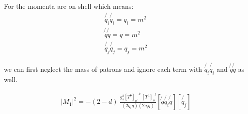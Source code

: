 For the momenta are on-shell which means:
\begin{equation}
\begin{split}
\not{q_i}\not{q_i} = {q_i}= m^2\\
\not{q}\not{q} = {q}= m^2\\
\not{q_j}\not{q_j} = {q_j}= m^2
\end{split}
\end{equation}

we can first neglect the mass of patrons and ignore each term with $ \not{q_i}\not{q_i} $ and  $ \not{q}\not{q} $ as well.

\begin{equation}
\begin{split}
|M_1|^2=-(2-d)\:\frac{g_s^2  {[T^b]_{o\:^{\prime}}}^k \: {[T^a]_o}^l }{(2q_i q)(2q_i q)}
[\not{q} \not{q_i} \not{q}]
[\not{q_j}]
\end{split}
\end{equation}


